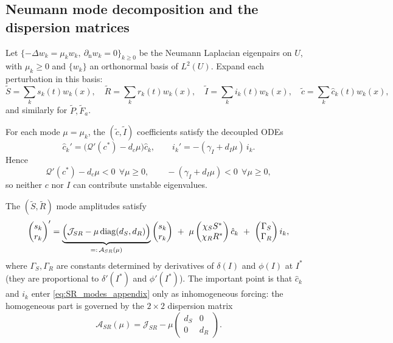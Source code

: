 \documentclass[pdflatex,sn-mathphys-ay]{sn-jnl}
\theoremstyle{thmstyleone}
\theoremstyle{definition}
\theoremstyle{remark}
\begin{document}
\begin{appendices}
\subsection{Neumann mode decomposition and the dispersion matrices}
Let $\{-\Delta w_k=\mu_k w_k,\ \partial_{\mathrm n}w_k=0\}_{k\ge 0}$ be the Neumann Laplacian eigenpairs on $U$, with $\mu_k\ge 0$ and $\{w_k\}$ an orthonormal basis of $L^2(U)$.
Expand each perturbation in this basis:
\[
\tilde S=\sum_k s_k(t)w_k(x),\quad
\tilde R=\sum_k r_k(t)w_k(x),\quad
\tilde I=\sum_k i_k(t)w_k(x),\quad
\tilde c=\sum_k \hat c_k(t)w_k(x),
\]
and similarly for $\tilde P,\tilde F_a$.

For each mode $\mu=\mu_k$, the $(\tilde c,\tilde I)$ coefficients satisfy the decoupled ODEs
\begin{equation}
\label{eq:cI_modes_appendix}
\hat c_k' = \bigl(\mathcal Q'(c^*)-d_c\mu\bigr)\hat c_k,
\qquad
i_k' = -(\gamma_I+d_I\mu)\,i_k.
\end{equation}
Hence
\[
\mathcal Q'(c^*)-d_c\mu<0\ \ \forall \mu\ge 0,
\qquad
-(\gamma_I+d_I\mu)<0\ \ \forall \mu\ge 0,
\]
so neither $c$ nor $I$ can contribute unstable eigenvalues.

The $(\tilde S,\tilde R)$ mode amplitudes satisfy
\begin{equation}
\label{eq:SR_modes_appendix}
\begin{pmatrix}s_k\\ r_k\end{pmatrix}'=
\underbrace{\Bigl(\mathcal J_{SR}-\mu\,\mathrm{diag}(d_S,d_R)\Bigr)}_{=:\,\mathcal A_{SR}(\mu)}
\begin{pmatrix}s_k\\ r_k\end{pmatrix}
\ +\ 
\mu
\begin{pmatrix}
\chi_S S^*\\
\chi_R R^*
\end{pmatrix}\hat c_k
\ +\ 
\begin{pmatrix}
\Gamma_S\\ \Gamma_R
\end{pmatrix} i_k,
\end{equation}
where $\Gamma_S,\Gamma_R$ are constants determined by derivatives of $\delta(I)$ and $\phi(I)$ at $I^*$ (they are proportional to $\delta'(I^*)$ and $\phi'(I^*)$).  The important point is that $\hat c_k$ and $i_k$ enter \eqref{eq:SR_modes_appendix} only as inhomogeneous forcing: the homogeneous part is governed by the $2\times 2$ dispersion matrix
\begin{equation}
\label{eq:ASR_def_appendix}
\mathcal A_{SR}(\mu)=\mathcal J_{SR}-\mu
\begin{pmatrix}
d_S & 0\\
0 & d_R
\end{pmatrix}.
\end{equation}


\end{appendices}
\end{document}
